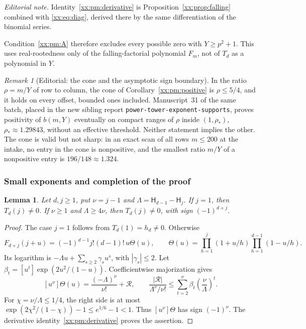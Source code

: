 \documentclass[11pt,a4paper]{article}
\numberwithin{equation}{section}
\newtheorem{lemma}[theorem]{Lemma}
\theoremstyle{definition}
\theoremstyle{remark}
\newtheorem{remark}[theorem]{Remark}
\theoremstyle{plain}
\newcommand{\coef}[2]{[#1^{#2}]}
\begin{document}
\emph{Editorial note.}  Identity~\eqref{xx:pm:derivative} is
Proposition~\ref{xx:prop:falling} combined with \eqref{xx:eq:diag}, derived
there by the same differentiation of the binomial series.

Condition~\eqref{xx:pm:A} therefore excludes every possible zero with
$Y\ge p^2+1$. This uses real-rootedness only of the falling-factorial
polynomial $F_m$, not of $T_d$ as a polynomial in $Y$.

\begin{remark}[Editorial: the cone and the asymptotic sign boundary]\label{xx:lc:rem:cone}
In the ratio $\rho=m/Y$ of row to column, the cone of
Corollary~\ref{xx:pm:positive} is $\rho\le5/4$, and it holds on every offset,
bounded ones included.  Manuscript~31 of the same batch, placed in the new
sibling report \texttt{power-tower-exponent-supports}, proves positivity of
$b(m,Y)$ eventually on compact ranges of $\rho$ inside $(1,\rho_*)$,
$\rho_*\approx1.29843$, without an effective threshold.  Neither statement
implies the other.  The cone is valid but not sharp: in an exact scan of all
rows $m\le200$ at the intake, no entry in the cone is nonpositive, and the
smallest ratio $m/Y$ of a nonpositive entry is $196/148\approx1.324$.
\end{remark}

\subsubsection{Small exponents and completion of the proof}

\begin{lemma}\label{xx:pm:small}
Let $d,j\ge1$, put $\nu=j-1$ and $\Lambda=\mathsf H_{d-1}-\mathsf H_j$. If $j=1$,
then $T_d(j)\ne0$. If $\nu\ge1$ and $\Lambda\ge4\nu$, then $T_d(j)\ne0$, with
sign $(-1)^{d+j}$.
\end{lemma}
\begin{proof}
The case $j=1$ follows from $T_d(1)=h_d\ne0$. Otherwise
\[
 F_{d+j}(j+u)=(-1)^{d-1}j!(d-1)!\,u\Theta(u),\qquad
 \Theta(u)=\prod_{h=1}^j(1+u/h)\prod_{h=1}^{d-1}(1-u/h).
\]
Its logarithm is $-\Lambda u+\sum_{s\ge2}\gamma_su^s$, with $|\gamma_s|\le2$.
Let $\beta_t=\coef{u}{t}\exp(2u^2/(1-u))$. Coefficientwise majorization gives
\[
 \coef{u}{\nu}\Theta(u)=\frac{(-\Lambda)^\nu}{\nu!}+\mathcal R,\qquad
 \frac{|\mathcal R|}{\Lambda^\nu/\nu!}\le\sum_{t=2}^\nu \beta_t\left(\frac
 \nu\Lambda\right)^t.
\]
For $\chi=\nu/\Lambda\le1/4$, the right side is at most
$\exp(2\chi^2/(1-\chi))-1\le e^{1/6}-1<1$.
Thus $\coef{u}{\nu}\Theta$ has sign $(-1)^\nu$. The derivative
identity~\eqref{xx:pm:derivative} proves the assertion.
\end{proof}
\end{document}
